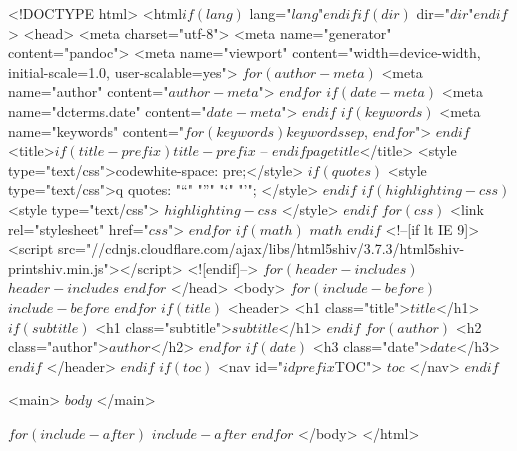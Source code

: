 <!DOCTYPE html>
<html$if(lang)$ lang="$lang$"$endif$$if(dir)$ dir="$dir$"$endif$>
<head>
  <meta charset="utf-8">
  <meta name="generator" content="pandoc">
  <meta name="viewport" content="width=device-width, initial-scale=1.0, user-scalable=yes">
$for(author-meta)$
  <meta name="author" content="$author-meta$">
$endfor$
$if(date-meta)$
  <meta name="dcterms.date" content="$date-meta$">
$endif$
$if(keywords)$
  <meta name="keywords" content="$for(keywords)$$keywords$$sep$, $endfor$">
$endif$
  <title>$if(title-prefix)$$title-prefix$ – $endif$$pagetitle$</title>
  <style type="text/css">code{white-space: pre;}</style>
$if(quotes)$
  <style type="text/css">q { quotes: "“" "”" "‘" "’"; }</style>
$endif$
$if(highlighting-css)$
  <style type="text/css">
$highlighting-css$
  </style>
$endif$
$for(css)$
  <link rel="stylesheet" href="$css$">
$endfor$
$if(math)$
  $math$
$endif$
  <!--[if lt IE 9]>
    <script src="//cdnjs.cloudflare.com/ajax/libs/html5shiv/3.7.3/html5shiv-printshiv.min.js"></script>
  <![endif]-->
$for(header-includes)$
  $header-includes$
$endfor$
</head>
<body>
$for(include-before)$
$include-before$
$endfor$
$if(title)$
<header>
<h1 class="title">$title$</h1>
$if(subtitle)$
<h1 class="subtitle">$subtitle$</h1>
$endif$
$for(author)$
<h2 class="author">$author$</h2>
$endfor$
$if(date)$
<h3 class="date">$date$</h3>
$endif$
</header>
$endif$
$if(toc)$
<nav id="$idprefix$TOC">
$toc$
</nav>
$endif$

<main>
$body$
</main>

$for(include-after)$
$include-after$
$endfor$
</body>
</html>
